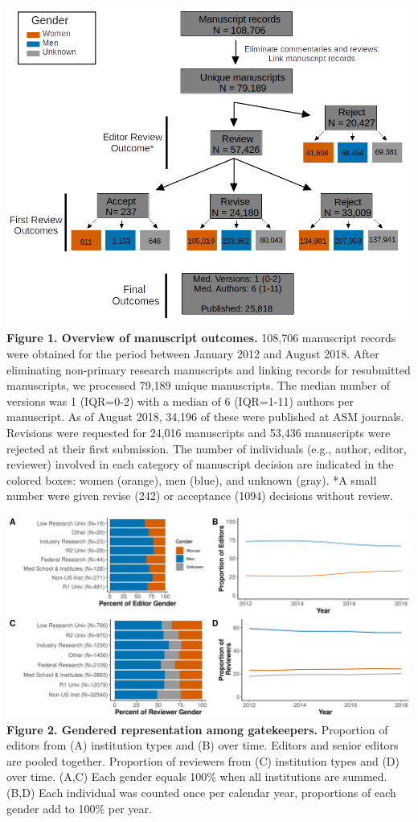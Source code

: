 \documentclass[11pt,]{article}
\begin{document}
\newpage

\includegraphics{population_diagram.png} \textbf{Figure 1. Overview of
manuscript outcomes.} 108,706 manuscript records were obtained for the
period between January 2012 and August 2018. After eliminating
non-primary research manuscripts and linking records for resubmitted
manuscripts, we processed 79,189 unique manuscripts. The median number
of versions was 1 (IQR=0-2) with a median of 6 (IQR=1-11) authors per
manuscript. As of August 2018, 34,196 of these were published at ASM
journals. Revisions were requested for 24,016 manuscripts and 53,436
manuscripts were rejected at their first submission. The number of
individuals (e.g., author, editor, reviewer) involved in each category
of manuscript decision are indicated in the colored boxes: women
(orange), men (blue), and unknown (gray). *A small number were given
revise (242) or acceptance (1094) decisions without review.

\newpage

\includegraphics{Figure_2.png} \textbf{Figure 2. Gendered representation
among gatekeepers.} Proportion of editors from (A) institution types and
(B) over time. Editors and senior editors are pooled together.
Proportion of reviewers from (C) institution types and (D) over time.
(A,C) Each gender equals 100\% when all institutions are summed.(B,D)
Each individual was counted once per calendar year, proportions of each
gender add to 100\% per year.
\end{document}
